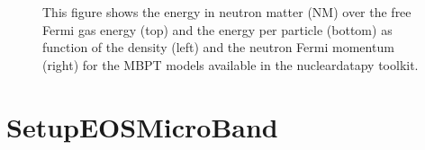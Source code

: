 \documentclass[letterpaper,10pt,english]{sphinxmanual}
\begin{document}
\begin{figure}[htbp]
\centering
\capstart

\noindent{}
\caption{This figure shows the energy in neutron matter (NM) over the free Fermi gas energy (top) and the energy per particle (bottom) as function of the density (left) and the neutron Fermi momentum (right) for the MBPT models available in the nucleardatapy toolkit.}\label{\detokenize{source/api/setup_eos_micro:id5}}\end{figure}

\sphinxstepscope


\section{SetupEOSMicroBand}
\label{\detokenize{source/api/setup_eos_micro_band:setupeosmicroband}}\label{\detokenize{source/api/setup_eos_micro_band::doc}}\label{\detokenize{source/api/setup_eos_micro_band:module-nucleardatapy.eos.setup_micro_band}}
\end{document}
